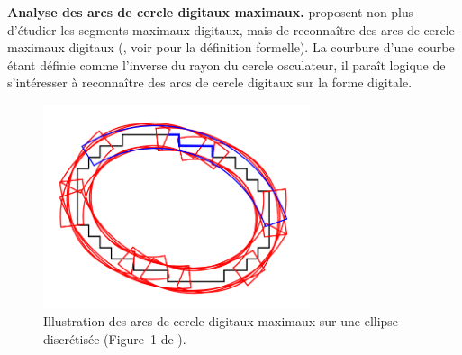 

\noindent\textbf{Analyse des arcs de cercle digitaux maximaux.\quad}
 proposent non plus d'étudier les segments
maximaux digitaux, mais de reconnaître des arcs de cercle maximaux digitaux
(\MDCA, voir  pour la définition
formelle). La courbure d'une courbe étant définie comme l'inverse du rayon du
cercle osculateur, il paraît logique de s'intéresser à reconnaître des arcs de
cercle digitaux sur la forme digitale.

\begin{figure}[ht]{
    \begin{center}
    \includegraphics[height=6cm]{images/Notions/MDCA}
    \end{center}}
    \caption[Illustration des arcs de cercle digitaux maximaux sur une ellipse.]
    {Illustration des arcs de cercle digitaux maximaux sur une ellipse discrétisée (Figure~1
    de \cite{Roussillon2011}).\label{fig:mdca-curv-figure}}
\end{figure}

